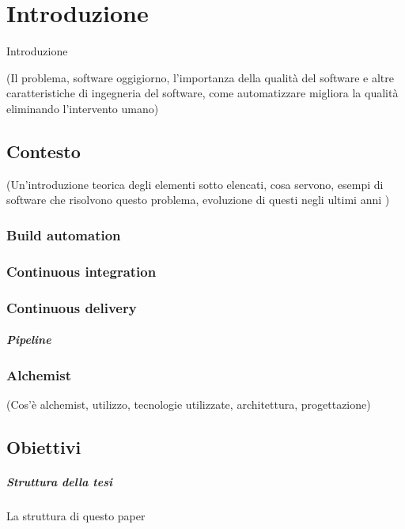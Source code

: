 \chapter{Introduzione}
\label{chap:introduction}

Introduzione 

(Il problema, software oggigiorno, l'importanza della qualità del software e altre caratteristiche di ingegneria del software, come automatizzare migliora la qualità eliminando l'intervento umano)

\section{Contesto}

(Un'introduzione teorica degli elementi sotto elencati, cosa servono, esempi di software che risolvono questo problema, evoluzione di questi negli ultimi anni )

\subsection{Build automation}
\subsection{Continuous integration}
\subsection{Continuous delivery}
\paragraph{Pipeline}

\subsection{Alchemist}

(Cos'è alchemist, utilizzo, tecnologie utilizzate, architettura, progettazione)

\section{Obiettivi}

\paragraph{Struttura della tesi}

La struttura di questo paper
